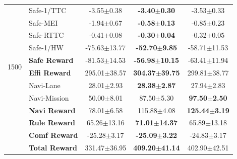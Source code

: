 {\begin{longtable}{l l c c c}
  \multirow{10}{*}{1500}
  & Safe-1/TTC       & -3.55$\pm$0.38 & \textbf{-3.40$\pm$0.30} & -3.53$\pm$0.33 \\
  & Safe-MEI         & -1.94$\pm$0.67 & \textbf{-0.58$\pm$0.13} & -0.85$\pm$0.23 \\
  & Safe-RTTC        & -0.41$\pm$0.08 & \textbf{-0.30$\pm$0.04} & -0.32$\pm$0.05 \\
  & Safe-1/HW        & -75.63$\pm$13.77 & \textbf{-52.70$\pm$9.85} & -58.71$\pm$11.53 \\
  & \textbf{Safe Reward} & -81.53$\pm$14.53 & \textbf{-56.98$\pm$10.15} & -63.41$\pm$11.94 \\
  & \textbf{Effi Reward} & 295.01$\pm$38.57 & \textbf{304.37$\pm$39.75} & 299.81$\pm$38.77 \\
  & Navi-Lane        & 28.01$\pm$2.93 & \textbf{28.38$\pm$2.87} & 27.94$\pm$2.83 \\
  & Navi-Mission     & 50.00$\pm$8.01 & 87.50$\pm$5.30 & \textbf{97.50$\pm$2.50} \\
  & \textbf{Navi Reward} & 78.01$\pm$6.58 & 115.88$\pm$4.08 & \textbf{125.44$\pm$3.19} \\
  & \textbf{Rule Reward} & 65.26$\pm$13.16 & \textbf{71.01$\pm$14.37} & 65.89$\pm$13.18 \\
  & \textbf{Comf Reward} & -25.28$\pm$3.17 & \textbf{-25.09$\pm$3.22} & -24.83$\pm$3.17 \\
  & \textbf{Total Reward} & 331.47$\pm$36.95 & \textbf{409.20$\pm$41.14} & 402.90$\pm$42.51 \\

  \end{longtable}
  }%








\printbibliography
